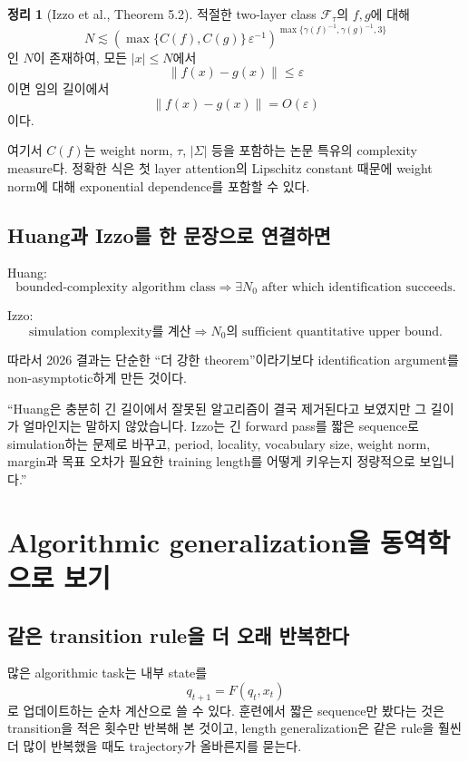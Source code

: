 \documentclass[11pt,a4paper,oneside,openany]{memoir}
\newcommand{\norm}[1]{\left\lVert #1\right\rVert}
\theoremstyle{definition}
\newtheorem{theorem}{정리}[chapter]
\begin{document}
\begin{theorem}[Izzo et al., Theorem 5.2]
적절한 two-layer class $\mathcal F_\tau$의 $f,g$에 대해
\[
N\lesssim
\left(
\max\{C(f),C(g)\}\,\varepsilon^{-1}
\right)^{\max\{\gamma(f)^{-1},\gamma(g)^{-1},3\}}
\]
인 $N$이 존재하여, 모든 $|x|\le N$에서
\[
\norm{f(x)-g(x)}\le\varepsilon
\]
이면 임의 길이에서
\[
\norm{f(x)-g(x)}=O(\varepsilon)
\]
이다.
\end{theorem}

여기서 $C(f)$는 weight norm, $\tau$, $|\Sigma|$ 등을 포함하는 논문 특유의 complexity measure다.
정확한 식은 첫 layer attention의 Lipschitz constant 때문에 weight norm에 대해 exponential dependence를 포함할 수 있다.

\section{Huang과 Izzo를 한 문장으로 연결하면}

Huang:
\[
\text{bounded-complexity algorithm class}
\Longrightarrow
\exists N_0\text{ after which identification succeeds.}
\]

Izzo:
\[
\text{simulation complexity를 계산}
\Longrightarrow
N_0\text{의 sufficient quantitative upper bound.}
\]

따라서 2026 결과는 단순한 ``더 강한 theorem''이라기보다 identification argument를 non-asymptotic하게 만든 것이다.

\begin{presentbox}
``Huang은 충분히 긴 길이에서 잘못된 알고리즘이 결국 제거된다고 보였지만 그 길이가 얼마인지는 말하지 않았습니다. Izzo는 긴 forward pass를 짧은 sequence로 simulation하는 문제로 바꾸고, period, locality, vocabulary size, weight norm, margin과 목표 오차가 필요한 training length를 어떻게 키우는지 정량적으로 보입니다.''
\end{presentbox}

\chapter{Algorithmic generalization을 동역학으로 보기}

\section{같은 transition rule을 더 오래 반복한다}

많은 algorithmic task는 내부 state를
\[
q_{t+1}=F(q_t,x_t)
\]
로 업데이트하는 순차 계산으로 쓸 수 있다.
훈련에서 짧은 sequence만 봤다는 것은 transition을 적은 횟수만 반복해 본 것이고,
length generalization은 같은 rule을 훨씬 더 많이 반복했을 때도 trajectory가 올바른지를 묻는다.
\end{document}
